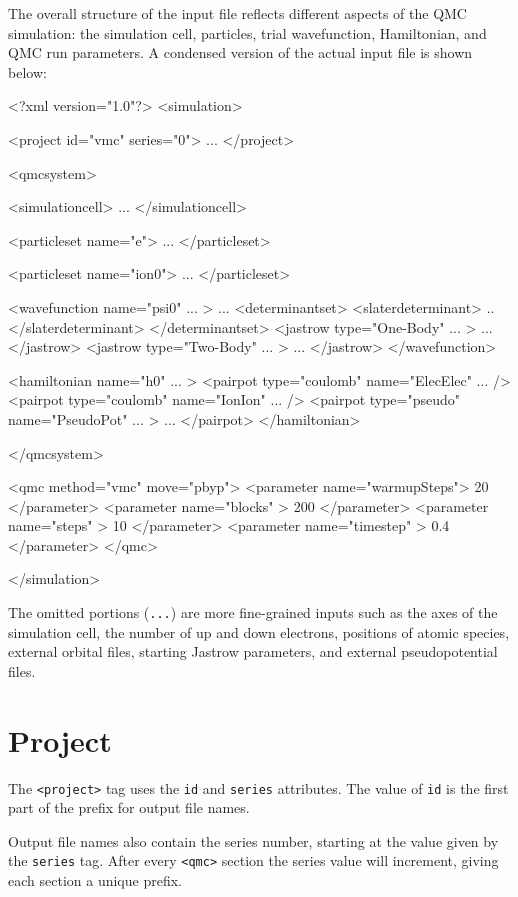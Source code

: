 The overall structure of the input file reflects different aspects of the QMC simulation: the simulation cell, particles, trial wavefunction, Hamiltonian, and QMC run parameters.  A condensed version of the actual input file is shown below:
\begin{shade}
<?xml version="1.0"?>
<simulation>

  <project id="vmc" series="0">
    ...
  </project>

  <qmcsystem>

    <simulationcell>
      ...
    </simulationcell>

    <particleset name="e">
      ...
    </particleset>

    <particleset name="ion0">
      ...
    </particleset>

    <wavefunction name="psi0" ... >
      ...
      <determinantset>
        <slaterdeterminant>
          ..
        </slaterdeterminant>
      </determinantset>
      <jastrow type="One-Body" ... >
         ...
      </jastrow>
      <jastrow type="Two-Body" ... >
        ...
      </jastrow>
    </wavefunction>

    <hamiltonian name="h0" ... >
      <pairpot type="coulomb" name="ElecElec" ... />
      <pairpot type="coulomb" name="IonIon"   ... />
      <pairpot type="pseudo" name="PseudoPot" ... >
        ...
      </pairpot>
    </hamiltonian>

   </qmcsystem>

   <qmc method="vmc" move="pbyp">
     <parameter name="warmupSteps">   20 </parameter>
     <parameter name="blocks"     >  200 </parameter>
     <parameter name="steps"      >   10 </parameter>
     <parameter name="timestep"   >  0.4 </parameter>
   </qmc>

</simulation>
\end{shade}
The omitted portions (\texttt{...}) are more fine-grained inputs such as the axes of the simulation cell, the number of up and down electrons, positions of atomic species, external orbital files, starting Jastrow parameters, and external pseudopotential files.  


\section{Project}
The \texttt{<project>} tag uses the \texttt{id} and \texttt{series} attributes.
The value of \texttt{id} is the first part of the prefix for output file names.

Output file names also contain the series number, starting at the value given by the
\texttt{series} tag.  After every \texttt{<qmc>} section the series value will increment, giving each section a unique prefix.

